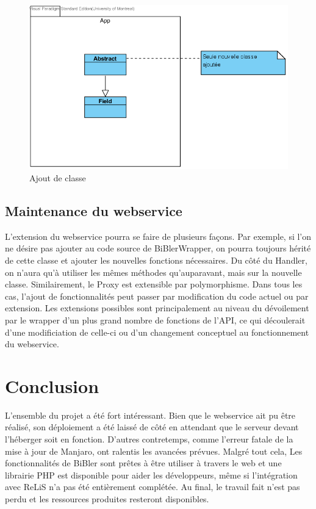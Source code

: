 \documentclass[12pt,titlepage]{article}
\let\oldsection\section
\renewcommand\section{\clearpage\oldsection}
\begin{document}
\begin{figure}[h]
\caption{Ajout de classe}
\includegraphics[width=\textwidth,height=.5\textheight,keepaspectratio]{maintenance.png}
\end{figure}

\subsection{Maintenance du webservice}
L'extension du webservice pourra se faire de plusieurs façons. Par exemple, si l'on ne désire pas ajouter au code source de BiBlerWrapper, on pourra toujours hérité de cette classe et ajouter les nouvelles fonctions nécessaires. Du côté du Handler, on n'aura qu'à utiliser les mêmes méthodes qu'auparavant, mais sur la nouvelle classe. Similairement, le Proxy est extensible par polymorphisme. Dans tous les cas, l'ajout de fonctionnalités peut passer par modification du code actuel ou par extension. Les extensions possibles sont principalement au niveau du dévoilement par le wrapper d'un plus grand nombre de fonctions de l'API, ce qui découlerait d'une modificiation de celle-ci ou d'un changement conceptuel au fonctionnement du webservice.


\section{Conclusion}
L'ensemble du projet a été fort intéressant. Bien que le webservice ait pu être réalisé, son déploiement a été laissé de côté en attendant que le serveur devant l'héberger soit en fonction. D'autres contretemps, comme l'erreur fatale de la mise à jour de Manjaro, ont ralentis les avancées prévues. Malgré tout cela, Les fonctionnalités de BiBler sont prêtes à être utiliser à travers le web et une librairie PHP est disponible pour aider les développeurs, même si l'intégration avec ReLiS n'a pas été entièrement complétée. Au final, le travail fait n'est pas perdu et les ressources produites resteront disponibles.\newline
\end{document}
